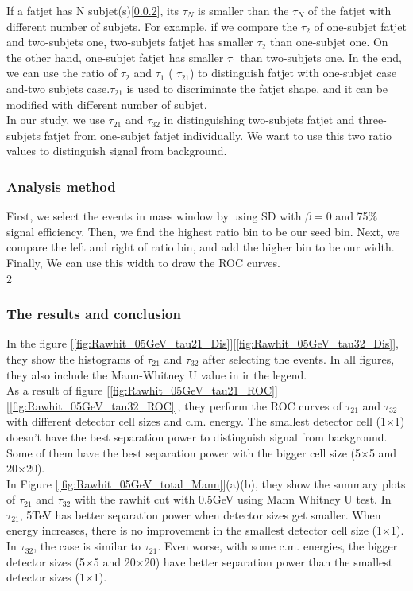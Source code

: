 If a fatjet has N subjet(s)[\ref{}], its $\tau_{N}$ is smaller than the $\tau_{N}$ of the fatjet with different number of subjets. For example, if we compare the  $\tau_{2}$ of one-subjet fatjet and two-subjets one, two-subjets fatjet has smaller $\tau_{2}$ than one-subjet one. On the other hand, one-subjet fatjet has smaller $\tau_{1}$ than two-subjets one. In the end, we can use the ratio of  $\tau_{2}$ and  $\tau_{1}$ ( $\tau_{21}$) to distinguish fatjet with one-subjet case and-two subjets case.$\tau_{21}$ is used to discriminate the fatjet shape, and it can be modified with different number of subjet.\\

In our study, we use $\tau_{21}$  and $\tau_{32}$ in distinguishing two-subjets fatjet and three-subjets fatjet from one-subjet fatjet individually. We want to use this two ratio values to distinguish signal from background.\\
\subsubsection{Analysis method}
First, we select the events in mass window by using SD with $\beta=0$ and 75$\%$ signal efficiency. Then, we find the highest ratio bin to be our seed bin. Next, we compare the left and right of ratio bin, and add the higher bin to be our width. Finally,  We can use this width to draw the ROC curves.\\2
\subsubsection{The results and conclusion}
In the figure [\ref{fig:Rawhit_05GeV_tau21_Dis}][\ref{fig:Rawhit_05GeV_tau32_Dis}], they show the histograms of $\tau_{21}$ and $\tau_{32}$ after selecting the events. In all figures, they also include the Mann-Whitney U value in ir the legend.\\

As a result of figure [\ref{fig:Rawhit_05GeV_tau21_ROC}][\ref{fig:Rawhit_05GeV_tau32_ROC}], they perform the ROC curves of $\tau_{21}$ and $\tau_{32}$ with different detector cell sizes and c.m. energy. The smallest detector cell (1$\times$1) doesn't have the best separation power to distinguish signal from background. Some of them have the best separation power with the bigger cell size (5$\times$5 and 20$\times$20).\\

In Figure [\ref{fig:Rawhit_05GeV_total_Mann}](a)(b), they show the summary plots of $\tau_{21}$ and $\tau_{32}$ with the rawhit cut with 0.5GeV using Mann Whitney U test. In $\tau_{21}$, 5TeV has better separation power when detector sizes get smaller. When energy increases, there is no improvement in the smallest detector cell size (1$\times$1). In $\tau_{32}$, the case is similar to  $\tau_{21}$. Even worse, with some c.m. energies, the bigger detector sizes (5$\times$5 and 20$\times$20) have better separation power than the smallest detector sizes (1$\times$1). 
